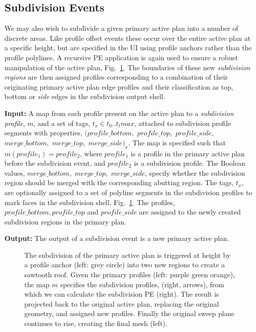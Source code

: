 \FloatBarrier
\subsection{Subdivision Events}
\label{sec:subdiv_events}

We may also wish to subdivide a given primary active plan into a number of discrete areas. Like profile offset events these occur over the entire active plan at a specific height, but are specified in the UI using profile anchors rather than the profile polylines. A recursive PE application is again used to ensure a robust manipulation of the active plan, Fig.~\ref{fig:subdiv}. The boundaries of these new \emph{subdivision regions} are then assigned profiles corresponding to a combination of their originating primary active plan edge profiles and their classification as {top, bottom} or \emph{side} edges in the subdivision output shell.

{\bf Input:} A map from each profile present on the active plan to a \emph{subdivision profile}, $m$, and a set of tags, $t_x \in t_0..t_tmax$, attached to subdivision profile segments with properties, $(profile\_bottom,$ $profile\_top,$ $profile\_side,$ $merge\_bottom,$ $merge\_top,$ $ merge\_side)_x$. The map is specified such that $m(profile_1)=profile_2$, where $profile_1$ is a profile in the primary active plan before the subdivision event, and $profile_2$ is a subdivision profile. The Boolean values, $merge\_bottom,$ $merge\_top,$ $merge\_side$, specify whether the subdivision region should be merged with the corresponding abutting region.  The tags, $t_x$, are optionally assigned to a set of polyline segments in the subdivision profiles to mark faces in the subdivision shell, Fig.~\ref{fig:subdiv}. The profiles, $profile\_bottom, profile\_top$ and  $profile\_side$ are assigned to the newly created subdivision regions in the primary plan. 

{\bf Output:} The output of a subdivision event is a new primary active plan.

\begin{figure}
  \def\svgwidth{0.9\columnwidth}
  
  \caption[Subdivision events]{\label{fig:subdiv}The subdivision of the primary active plan is triggered at height by a profile anchor (left: grey circle) into two new regions to create a sawtooth roof. Given the primary profiles (left: purple green orange), the map $m$ specifies the subdivision profiles, (right, arrows), from which we can calculate the subdivision PE (right). The result is projected back to the original active plan, replacing the original geometry, and assigned new profiles. Finally the original sweep plane continues to rise, creating the final mesh (left).}
\end{figure}

